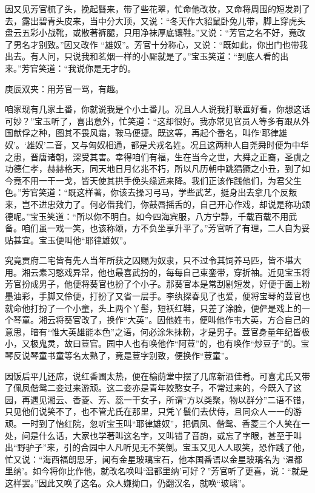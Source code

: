 \begin{parag}
    因又见芳官梳了头，挽起䰖来，带了些花翠，忙命他改妆，又命将周围的短发剃了去，露出碧青头皮来，当中分大顶，又说：“冬天作大貂鼠卧兔儿带，脚上穿虎头盘云五彩小战靴，或散著裤腿，只用净袜厚底镶鞋。”又说：“芳官之名不好，竟改了男名才别致。”因又改作 “雄奴”。芳官十分称心，又说：“既如此，你出门也带我出去。有人问，只说我和茗烟一样的小厮就是了。”宝玉笑道：“到底人看的出来。”芳官笑道：“我说你是无才的。\begin{note}庚辰双夹：用芳官一骂，有趣。\end{note}咱家现有几家土番，你就说我是个小土番儿。况且人人说我打联垂好看，你想这话可妙？”宝玉听了，喜出意外，忙笑道：“这却很好。我亦常见官员人等多有跟从外国献俘之种，图其不畏风霜，鞍马便捷。既这等，再起个番名，叫作‘耶律雄奴’。‘雄奴’二音，又与匈奴相通，都是犬戎名姓。况且这两种人自尧舜时便为中华之患，晋唐诸朝，深受其害。幸得咱们有福，生在当今之世，大舜之正裔，圣虞之功德仁孝，赫赫格天，同天地日月亿兆不朽，所以凡历朝中跳猖獗之小丑，到了如今竟不用一干一戈，皆天使其拱手俛头缘远来降。我们正该作践他们，为君父生色。”芳官笑道：“既这样著，你该去操习弓马，学些武艺，挺身出去拿几个反叛来，岂不进忠效力了。何必借我们，你鼓唇摇舌的，自己开心作戏，却说是称功颂德呢。”宝玉笑道：“所以你不明白。如今四海宾服，八方宁静，千载百载不用武备。咱们虽一戏一笑，也该称颂，方不负坐享升平了。”芳官听了有理，二人自为妥贴甚宜。宝玉便叫他“耶律雄奴”。
\end{parag}


\begin{parag}
    究竟贾府二宅皆有先人当年所获之囚赐为奴隶，只不过令其饲养马匹，皆不堪大用。湘云素习憨戏异常，他也最喜武扮的，每每自己束銮带，穿折袖。近见宝玉将芳官扮成男子，他便将葵官也扮了个小子。那葵官本是常刮剔短发，好便于面上粉墨油彩，手脚又伶便，打扮了又省一层手。李纨探春见了也爱，便将宝琴的荳官也就命他打扮了一个小童，头上两个丫髻，短袄红鞋，只差了涂脸，便俨是戏上的一个琴童。湘云将葵官改了，换作“大英”。因他姓韦，便叫他作韦大英，方合自己的意思，暗有“惟大英雄能本色”之语，何必涂朱抹粉，才是男子。荳官身量年纪皆极小，又极鬼灵，故曰荳官。园中人也有唤他作“阿荳”的，也有唤作“炒豆子”的。宝琴反说琴童书童等名太熟了，竟是荳字别致，便换作“荳童”。
\end{parag}


\begin{parag}
    因饭后平儿还席，说红香圃太热，便在榆荫堂中摆了几席新酒佳肴。可喜尤氏又带了佩凤偕鸳二妾过来游顽。这二妾亦是青年姣憨女子，不常过来的，今既入了这园，再遇见湘云、香菱、芳、蕊一干女子，所谓“方以类聚，物以群分”二语不错，只见他们说笑不了，也不管尤氏在那里，只凭丫鬟们去伏侍，且同众人一一的游顽。一时到了怡红院，忽听宝玉叫“耶律雄奴”，把佩凤、偕鸳、香菱三个人笑在一处，问是什么话，大家也学著叫这名字，又叫错了音韵，或忘了字眼，甚至于叫出“野驴子”来，引的合园中人凡听见无不笑倒。宝玉又见人人取笑，恐作践了他，忙又说：“海西福朗思牙，闻有金星玻璃宝石，他本国番语以金星玻璃名为 ‘温都里纳’。如今将你比作他，就改名唤叫‘温都里纳’可好？”芳官听了更喜，说：“就是这样罢。”因此又唤了这名。众人嫌拗口，仍翻汉名，就唤“玻璃”。
\end{parag}


